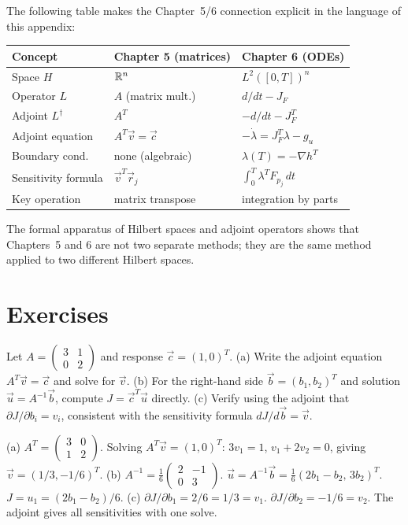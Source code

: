 The following table makes the Chapter~5/6 connection explicit in
the language of this appendix:

\begin{center}
\renewcommand{\arraystretch}{1.4}
\begin{tabular}{lll}
\toprule
Concept & Chapter 5 (matrices) & Chapter 6 (ODEs) \\
\midrule
Space $H$ & $\mathbb{R}^n$ & $L^2([0,T])^n$ \\
Operator $L$ & $A$ (matrix mult.) & $d/dt - J_F$ \\
Adjoint $L^\dagger$ & $A^T$ & $-d/dt - J_F^T$ \\
Adjoint equation & $A^T\vec{v} = \vec{c}$ & $-\dot{\lambda} = J_F^T\lambda - g_u$ \\
Boundary cond. & none (algebraic) & $\lambda(T) = -\nabla h^T$ \\
Sensitivity formula & $\vec{v}^T\vec{r}_j$ & $\int_0^T\lambda^T F_{p_j}\,dt$ \\
Key operation & matrix transpose & integration by parts \\
\bottomrule
\end{tabular}
\end{center}

The formal apparatus of Hilbert spaces and adjoint operators shows that
Chapters~5 and 6 are not two separate methods; they are the same
method applied to two different Hilbert spaces.

\section{Exercises}
\label{appsec:B_exercises}

\begin{selfcheck}
Let $A = \begin{pmatrix} 3 & 1 \\ 0 & 2 \end{pmatrix}$
and response $\vec{c} = (1, 0)^T$.
(a) Write the adjoint equation $A^T\vec{v} = \vec{c}$ and solve for $\vec{v}$.
(b) For the right-hand side $\vec{b} = (b_1, b_2)^T$ and solution
$\vec{u} = A^{-1}\vec{b}$, compute $J = \vec{c}^T\vec{u}$ directly.
(c) Verify using the adjoint that $\partial J/\partial b_i = v_i$,
consistent with the sensitivity formula $dJ/d\vec{b} = \vec{v}$.
\end{selfcheck}
\begin{scAnswer}
(a) $A^T = \begin{pmatrix}3&0\\1&2\end{pmatrix}$.
Solving $A^T\vec{v}=(1,0)^T$: $3v_1=1$, $v_1+2v_2=0$, giving $\vec{v}=(1/3,-1/6)^T$.
(b) $A^{-1} = \frac{1}{6}\begin{pmatrix}2&-1\\0&3\end{pmatrix}$.
$\vec{u} = A^{-1}\vec{b} = \frac{1}{6}(2b_1-b_2,\,3b_2)^T$.
$J = u_1 = (2b_1-b_2)/6$.
(c) $\partial J/\partial b_1 = 2/6 = 1/3 = v_1$. \checkmark
$\partial J/\partial b_2 = -1/6 = v_2$. \checkmark
The adjoint gives all sensitivities with one solve.
\end{scAnswer}

